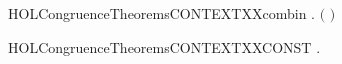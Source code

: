 \newcommand{\HOLCongruenceTheoremsCONTEXTXXcases}{\UseVerbatim{HOLCongruenceTheoremsCONTEXTXXcases}}
\begin{SaveVerbatim}{HOLCongruenceTheoremsCONTEXTXXcombin}
\HOLTokenTurnstile{} \HOLSymConst{\HOLTokenForall{}} .   \HOLSymConst{\HOLTokenConj{}}   \HOLSymConst{\HOLTokenImp{}}  \ensuremath{(} \HOLConst{\HOLTokenCompose} \ensuremath{)}
\end{SaveVerbatim}
\newcommand{\HOLCongruenceTheoremsCONTEXTXXcombin}{\UseVerbatim{HOLCongruenceTheoremsCONTEXTXXcombin}}
\begin{SaveVerbatim}{HOLCongruenceTheoremsCONTEXTXXCONST}
\HOLTokenTurnstile{} \HOLSymConst{\HOLTokenForall{}}.   \HOLSymConst{\HOLTokenImp{}}  
\end{SaveVerbatim}
\newcommand{\HOLCongruenceTheoremsCONTEXTXXCONST}{\UseVerbatim{HOLCongruenceTheoremsCONTEXTXXCONST}}
